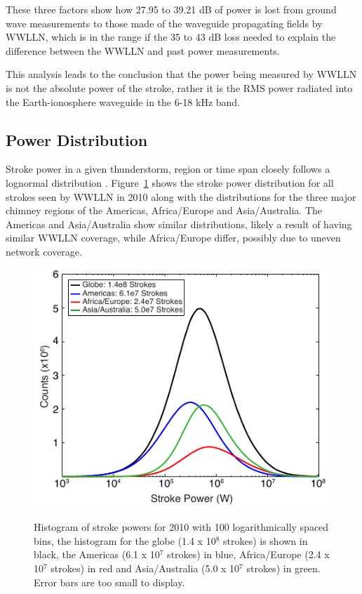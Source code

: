 These three factors show how 27.95 to 39.21 dB of power is lost from ground wave measurements to those made of the waveguide propagating fields by WWLLN, which is in the range if the 35 to 43 dB loss needed to explain the difference between the WWLLN and past power measurements.

This analysis leads to the conclusion that the power being measured by WWLLN is not the absolute power of the stroke, rather it is the RMS power radiated into the Earth-ionosphere waveguide in the 6-18 kHz band.

\subsection{Power Distribution}


Stroke power in a given thunderstorm, region or time span closely follows a lognormal distribution \citep{Golde1977}. Figure~\ref{energy:fig:distribution} shows the stroke power distribution for all strokes seen by WWLLN in 2010 along with the distributions for the three major chimney regions of the Americas, Africa/Europe and Asia/Australia.
The Americas and Asia/Australia show similar distributions, likely a result of having similar WWLLN coverage, while Africa/Europe differ, possibly due to uneven network coverage.

\begin{figure}[ht!]
\centering
\includegraphics[scale=1]{energy/Figures/PPS_Distribution2.pdf}\\
\caption{Histogram of stroke powers for 2010 with 100 logarithmically spaced bins, the histogram for the globe (1.4 x 10$^8$ strokes) is shown in black, the Americas (6.1 x 10$^7$ strokes) in blue, Africa/Europe (2.4 x 10$^7$ strokes) in red and Asia/Australia (5.0 x 10$^7$ strokes) in green. Error bars are too small to display.}
\label{energy:fig:distribution}
\end{figure}
 
